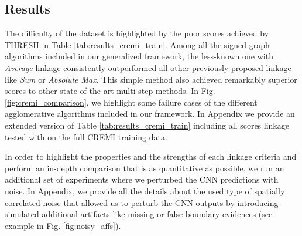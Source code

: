 


\subsection{Results}\label{sec:results}
The difficulty of the dataset is highlighted by the poor scores achieved by THRESH in Table \ref{tab:results_cremi_train}. Among all the signed graph algorithms included in our generalized framework, the less-known one with \emph{Average} linkage consistently outperformed all other previously proposed linkage like \emph{Sum} or \emph{Absolute Max}. This simple method also achieved remarkably superior scores to other state-of-the-art multi-step methods. 
In Fig. \ref{fig:cremi_comparison}, we highlight some failure cases of the different agglomerative algorithms included in our framework. In Appendix we provide an extended version of Table \ref{tab:results_cremi_train} including all scores linkage tested with \algname{} on the full CREMI training data. 

In order to highlight the properties and the strengths of each linkage criteria and  perform an in-depth comparison that is as quantitative as possible, we run an additional set of experiments where we perturbed the CNN predictions with noise. In Appendix, we provide all the details about the used type of spatially correlated noise that allowed us to perturb the CNN outputs by introducing simulated additional artifacts like missing or false boundary evidences (see example in Fig. \ref{fig:noisy_affs}).  

